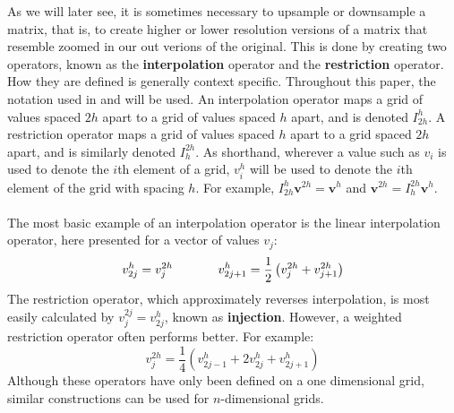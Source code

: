 As we will later see, it is sometimes necessary to upsample or downsample a matrix, that is, to create higher or lower resolution versions of a matrix that resemble zoomed in our out verions of the original. This is done by creating two operators, known as the \textbf{interpolation} operator and the \textbf{restriction} operator. How they are defined is generally context specific. Throughout this paper, the notation used in \cite{lee14} and \cite{briggs87} will be used. An interpolation operator maps a grid of values spaced $2h$ apart to a grid of values spaced $h$ apart, and is denoted $I_{2h}^h$. A restriction operator maps a grid of values spaced $h$ apart to a grid spaced $2h$ apart, and is similarly denoted $I_h^{2h}$. As shorthand, wherever a value such as $v_i$ is used to denote the $i$th element of a grid, $v_i^h$ will be used to denote the $i$th element of the grid with spacing $h$. For example, $I_{2h}^h\textbf{v}^{2h}=\textbf{v}^h$ and $\textbf{v}^{2h}=I_{h}^{2h}\textbf{v}^h$.
\\\\
The most basic example of an interpolation operator is the linear interpolation operator, here presented for a vector of values $v_j$:
\[v_{2j}^h=v_j^{2h}\hspace{.5in}
v_{2j+1}^h=\frac{1}{2}\left(v_j^{2h}+v_{j+1}^{2h}\right)\]
The restriction operator, which approximately reverses interpolation, is most easily calculated by $v_j^{2j}=v_{2j}^h$, known as \textbf{injection}. However, a weighted restriction operator often performs better. For example:
\[v_j^{2h}=\frac{1}{4}\left(
	v_{2j-1}^h+2v_{2j}^h+v_{2j+1}^h\right)\]
Although these operators have only been defined on a one dimensional grid, similar constructions can be used for $n$-dimensional grids.